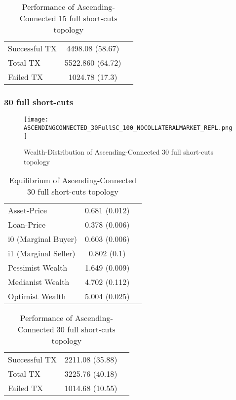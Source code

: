 \documentclass[Bachelorarbeit.tex]{subfiles}
\begin{document}
\begin{table}[H]
	\caption{Performance of Ascending-Connected 15 full short-cuts topology}
	\centering
	\begin{tabular} { l c r }
		\hline
		Successful TX & 4498.08 (58.67) \\
		Total TX & 5522.860 (64.72) \\
		Failed TX & 1024.78 (17.3) \\
		\hline
	\end{tabular}
\end{table}

\subsubsection{30 full short-cuts}
\begin{figure}[H]
	\centering
  \texttt{[image: ASCENDINGCONNECTED\_30FullSC\_100\_NOCOLLATERALMARKET\_REPL.png]}
	\caption{Wealth-Distribution of Ascending-Connected 30 full short-cuts topology}
	\label{fig1}
\end{figure}

\begin{table}[H]
	\caption{Equilibrium of Ascending-Connected 30 full short-cuts topology}
	\centering
	\begin{tabular} { l c r }
		\hline
		Asset-Price & 0.681 (0.012) \\
		Loan-Price & 0.378 (0.006) \\
		i0 (Marginal Buyer) & 0.603 (0.006) \\
		i1 (Marginal Seller) & 0.802 (0.1) \\
		Pessimist Wealth & 1.649 (0.009) \\
		Medianist Wealth & 4.702 (0.112) \\
		Optimist Wealth & 5.004 (0.025) \\
		\hline
	\end{tabular}
\end{table} 

\begin{table}[H]
	\caption{Performance of Ascending-Connected 30 full short-cuts topology}
	\centering
	\begin{tabular} { l c r }
		\hline
		Successful TX & 2211.08 (35.88) \\
		Total TX & 3225.76 (40.18) \\
		Failed TX & 1014.68 (10.55) \\
		\hline
	\end{tabular}
\end{table}
\end{document}
